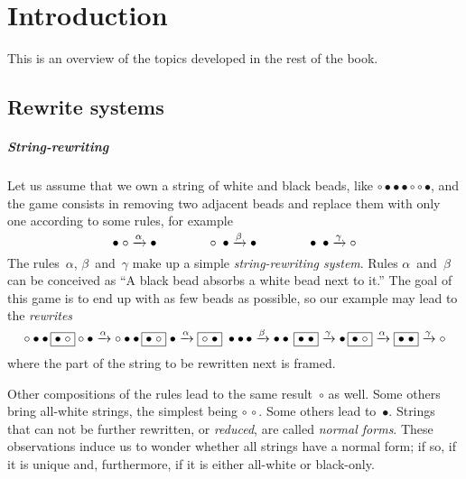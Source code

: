 \chapter{Introduction}
\setcounter{page}{1}

This is an overview of the topics developed in the rest of the book.

\section{Rewrite systems}

\paragraph{String-rewriting}

Let us assume that we own a string of white and black beads, like
\(\circ \bullet \bullet \bullet \circ \circ \bullet\), and the
game \citep{VanLeeuwen_1990a,Dershowitz_1993} consists in removing two
adjacent beads and replace them with only one according to some rules,
for example
\begin{equation*}
\bullet \; \circ   \xrightarrow{\smash{\alpha}} \bullet\qquad\qquad
\circ   \; \bullet \xrightarrow{\smash{\beta}} \bullet\qquad\qquad
\bullet \; \bullet \xrightarrow{\smash{\gamma}} \circ
\end{equation*}
The rules~\(\alpha\), \(\beta\)~and~\(\gamma\) make up a simple
\emph{string\hyp{}rewriting system}. Rules
\(\alpha\)~and~\(\beta\) can be conceived as ``A black bead absorbs
a white bead next to it.'' The goal of this game is to end up with
as few beads as possible, so our example may lead to the
\emph{rewrites}
\begin{equation*}
\circ \bullet \bullet \, \fbox{\(\bullet\; \circ\)} \circ \bullet
\xrightarrow{\smash{\alpha}} \circ \bullet \bullet \,
\fbox{\(\bullet\; \circ\)} \; \bullet \xrightarrow{\smash{\alpha}}
\fbox{\(\circ \; \bullet\)} \; \bullet \bullet \,\bullet
\xrightarrow{\smash{\beta}} \bullet \bullet \, \fbox{\(\bullet \;
  \bullet\)} \xrightarrow{\smash{\gamma}} \bullet \, \fbox{\(\bullet
  \; \circ\)} \xrightarrow{\smash{\alpha}} \fbox{\(\bullet \;
  \bullet\)} \xrightarrow{\smash{\gamma}} \circ
\end{equation*}
where the part of the string to be rewritten next is framed.

Other compositions of the rules lead to the same result~\(\circ\) as
well. Some others bring all\hyp{}white strings, the simplest being
\(\circ \, \circ\). Some others lead to~\(\bullet\). Strings that can
not be further rewritten, or \emph{reduced}, are called \emph{normal
  forms}. These observations induce
us to wonder whether all strings have a normal form; if so, if it is
unique and, furthermore, if it is either all\hyp{}white or
black\hyp{}only.

